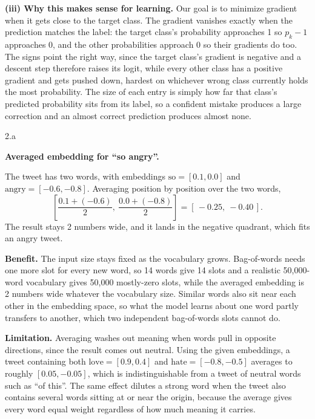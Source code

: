 \begin{answer}
  \medskip
  \textbf{(iii) Why this makes sense for learning.} Our goal is to minimize gradient when it gets close to the target class.
  The gradient vanishes exactly when the
  prediction matches the label: the target class's probability approaches 1 so $p_k - 1$
  approaches 0, and the other probabilities approach 0 so their gradients do too. The signs point
  the right way, since the target class's gradient is negative and a descent step therefore raises
  its logit, while every other class has a positive gradient and gets pushed down, hardest on
  whichever wrong class currently holds the most probability. The size of each entry is simply how
  far that class's predicted probability sits from its label, so a confident mistake produces a
  large correction and an almost correct prediction produces almost none.
\end{answer}

\clearpage

\LARGE
2.a
\normalsize

\begin{answer}
  \textbf{Averaged embedding for ``so angry''.}

  \medskip
  The tweet has two words, with embeddings $\text{so} = [0.1, 0.0]$ and
  $\text{angry} = [-0.6, -0.8]$. Averaging position by position over the two words,
  \[
    \left[\frac{0.1 + (-0.6)}{2},\ \frac{0.0 + (-0.8)}{2}\right] = [\,-0.25,\ -0.40\,].
  \]
  The result stays 2 numbers wide, and it lands in the negative quadrant, which fits an angry
  tweet.

  \medskip
  \textbf{Benefit.} The input size stays fixed as the vocabulary grows. Bag-of-words needs one more
  slot for every new word, so 14 words give 14 slots and a realistic 50,000-word vocabulary gives
  50,000 mostly-zero slots, while the averaged embedding is 2 numbers wide whatever the vocabulary
  size. Similar words also sit near each other in the embedding space, so what the model learns
  about one word partly transfers to another, which two independent bag-of-words slots cannot do.

  \medskip
  \textbf{Limitation.} Averaging washes out meaning when words pull in opposite directions, since
  the result comes out neutral. Using the given embeddings, a tweet containing both
  $\text{love} = [0.9, 0.4]$ and $\text{hate} = [-0.8, -0.5]$ averages to roughly $[0.05, -0.05]$,
  which is indistinguishable from a tweet of neutral words such as ``of this''. The same effect
  dilutes a strong word when the tweet also contains several words sitting at or near the origin,
  because the average gives every word equal weight regardless of how much meaning it carries.
\end{answer}

